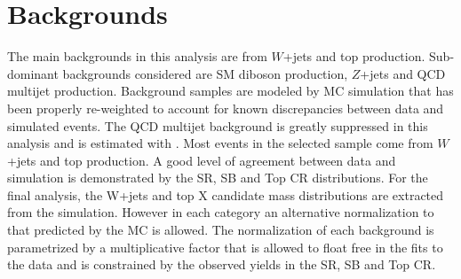 \section{Backgrounds}
The main backgrounds in this analysis are from $W$+jets and top production. Sub-dominant
backgrounds considered are SM diboson production, $Z$+jets and QCD multijet production.
Background samples are modeled by MC simulation that has been properly re-weighted to
account for known discrepancies between data and simulated events.
The QCD multijet background is greatly suppressed in this analysis and is estimated with \PYTHIA.
Most events in the selected sample come from $W$+jets and top production. 
A good level of agreement between data and simulation is demonstrated by the SR, SB and Top CR distributions.
For the final analysis, the W+jets and top X candidate mass distributions  are extracted from the simulation. 
However in each category an alternative normalization to that predicted by the MC is allowed. 
The normalization of each background is parametrized by a
multiplicative factor that is allowed to float free in the fits to the data and is constrained by the
observed yields in the SR, SB and Top CR.

